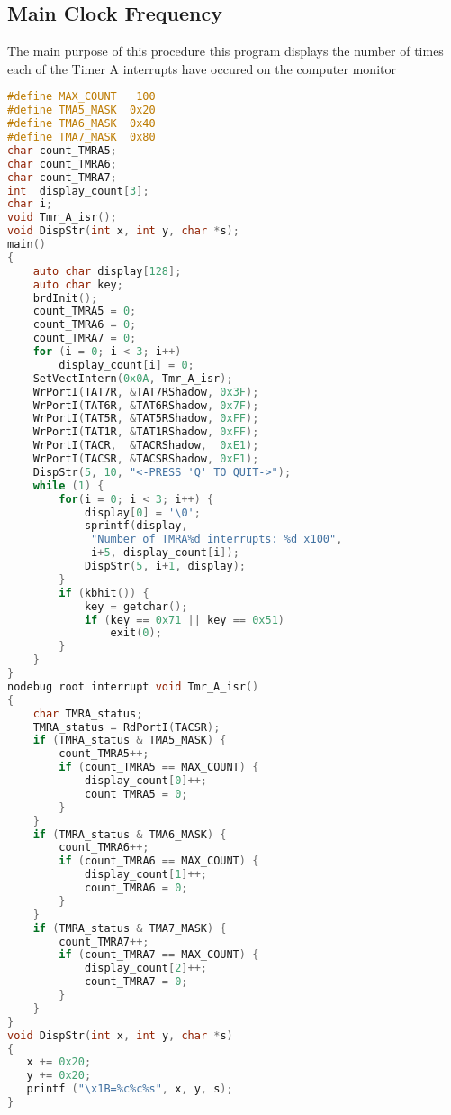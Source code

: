\subsection{Main Clock Frequency}

The main purpose of this procedure 
this program displays the number of times each of the Timer A interrupts have occured on the computer monitor

\begin{lstlisting}[language=C]
#define MAX_COUNT   100
#define TMA5_MASK  0x20
#define TMA6_MASK  0x40
#define TMA7_MASK  0x80
char count_TMRA5;
char count_TMRA6;
char count_TMRA7;
int  display_count[3];
char i;
void Tmr_A_isr();
void DispStr(int x, int y, char *s);
main()
{
    auto char display[128];
    auto char key;
    brdInit();
    count_TMRA5 = 0;
    count_TMRA6 = 0;
    count_TMRA7 = 0;
    for (i = 0; i < 3; i++)
        display_count[i] = 0;
    SetVectIntern(0x0A, Tmr_A_isr);
    WrPortI(TAT7R, &TAT7RShadow, 0x3F);
    WrPortI(TAT6R, &TAT6RShadow, 0x7F);
    WrPortI(TAT5R, &TAT5RShadow, 0xFF);
    WrPortI(TAT1R, &TAT1RShadow, 0xFF);
    WrPortI(TACR,  &TACRShadow,  0xE1);
    WrPortI(TACSR, &TACSRShadow, 0xE1);
    DispStr(5, 10, "<-PRESS 'Q' TO QUIT->");
    while (1) {
        for(i = 0; i < 3; i++) {
            display[0] = '\0';
            sprintf(display, 
             "Number of TMRA%d interrupts: %d x100",
             i+5, display_count[i]);
            DispStr(5, i+1, display);
        }
        if (kbhit()) {
            key = getchar();
            if (key == 0x71 || key == 0x51)
                exit(0);
        }
    }
}
nodebug root interrupt void Tmr_A_isr()
{
    char TMRA_status;
    TMRA_status = RdPortI(TACSR);
    if (TMRA_status & TMA5_MASK) {
        count_TMRA5++;
        if (count_TMRA5 == MAX_COUNT) {
            display_count[0]++;
            count_TMRA5 = 0;
        }
    }
    if (TMRA_status & TMA6_MASK) {
        count_TMRA6++;
        if (count_TMRA6 == MAX_COUNT) {
            display_count[1]++;
            count_TMRA6 = 0;
        }
    }
    if (TMRA_status & TMA7_MASK) {
        count_TMRA7++;
        if (count_TMRA7 == MAX_COUNT) {
            display_count[2]++;
            count_TMRA7 = 0;
        }
    }
}
void DispStr(int x, int y, char *s)
{
   x += 0x20;
   y += 0x20;
   printf ("\x1B=%c%c%s", x, y, s);
}
\end{lstlisting}